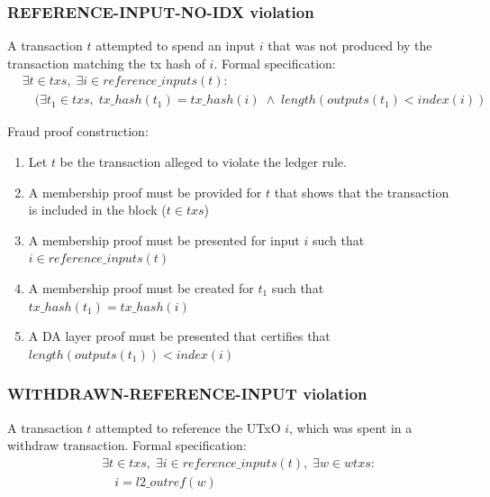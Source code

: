 \documentclass[../midgard.tex]{subfiles}
\begin{document}
\subsubsection{REFERENCE-INPUT-NO-IDX violation}
\label{violation:REFERENCE-INPUT-NO-IDX}
A transaction $t$ attempted to spend an input $i$ that was not produced by the transaction matching the tx hash of $i$.
Formal specification:
\begin{equation*}
\begin{split}
  &\exists t \in txs,\; \exists i \in reference\_inputs(t): \\
    &\quad( \exists t_1 \in txs,\;
      tx\_hash(t_1) = tx\_hash(i) \;\land\;
      length(outputs(t_1) <  index(i) )
\end{split}
\end{equation*}

Fraud proof construction:
\begin{enumerate}
  \item Let $t$ be the transaction alleged to violate the ledger rule. 
  \item A membership proof must be provided for $t$ that shows that the transaction is included in the block ($t \in txs$)
  \item A membership proof must be presented for input $i$ such that $i \in reference\_inputs(t)$
  \item A membership proof must be created for $t_1$ such that $tx\_hash(t_1) = tx\_hash(i)$
  \item A DA layer proof must be presented that certifies that $length(outputs(t_1)) < index(i)$
\end{enumerate}

\subsubsection{WITHDRAWN-REFERENCE-INPUT violation}
\label{violation:WITHDRAWN-REFERENCE-INPUT}
A transaction $t$ attempted to reference the UTxO $i$, which was spent in a withdraw transaction.
Formal specification:
\begin{equation*}
\begin{split}
  &\exists t \in txs,\; \exists i \in reference\_inputs(t),\; \exists w \in wtxs:\\
    &\quad i = l2\_outref(w)
\end{split}
\end{equation*}
\end{document}
